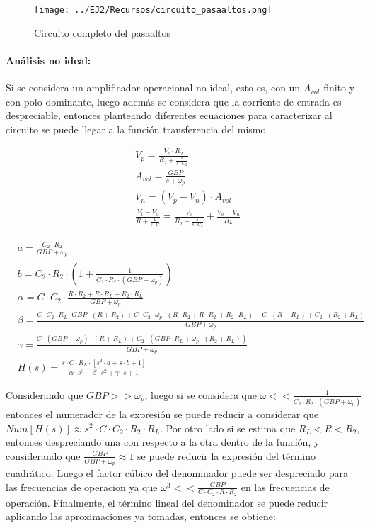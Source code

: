 \begin{figure}[H]
    \centering
    \texttt{[image: ../EJ2/Recursos/circuito\_pasaaltos.png]}
    \caption{Circuito completo del pasaaltos}
    \label{fig:circuito_pasaaltos}
\end{figure}

\paragraph*{An\'alisis no ideal:} Si se considera un amplificador operacional no ideal, esto es, con un $A_{vol}$ finito y con polo dominante, luego adem\'as
se considera que la corriente de entrada es despreciable, entonces planteando diferentes ecuaciones para caracterizar al circuito se puede llegar a la funci\'on transferencia
del mismo.

\begin{align}
    & V_p = \frac{V_o \cdot R_2}{R_2 + \frac{1}{s \cdot C_2}} \\
    & A_{vol} = \frac{GBP}{s + \omega_p} \\
    & V_n = (V_p - V_n) \cdot A_{vol} \\
    & \frac{V_i - V_o}{R + \frac{1}{s \cdot C}} = \frac{V_o}{R_2 + \frac{1}{s \cdot C_2}} + \frac{V_o - V_n}{R_L}
\end{align}

\begin{align*}
    & a = \frac{C_2 \cdot R_2}{GBP + \omega_p}\\
    & b = C_2 \cdot R_2 \cdot (1 + \frac{1}{C_2 \cdot R_2 \cdot(GBP + \omega_p)})\\
    & \alpha = C \cdot C_2 \cdot \frac{R \cdot R_2 + R \cdot R_L + R_2 \cdot R_L}{GBP + \omega_p}\\
    & \beta = \frac{ C \cdot C_2 \cdot R_L \cdot GBP \cdot (R + R_2) + C \cdot C_2 \cdot \omega_p \cdot (R \cdot R_2 + R \cdot R_L + R_2 \cdot R_L) + C \cdot (R + R_L) + C_2 \cdot (R_2 + R_L)}{GBP + \omega_p} \\
    & \gamma = \frac{C \cdot (GBP + \omega_p) \cdot (R + R_L) + C_2 \cdot (GBP \cdot R_L + \omega_p \cdot (R_2 + R_L)) }{GBP + \omega_p}\\
    & H(s) = \frac{s \cdot C \cdot R_L \cdot \left[s^{2} \cdot a + s \cdot b + 1 \right]}
    {\alpha \cdot s^{3} + \beta \cdot s^{2} + \gamma \cdot s + 1}
\end{align*}

Considerando que $GBP >> \omega_p$, luego si se considera que $\omega << \frac{1}{C_2 \cdot R_2 \cdot(GBP + \omega_p)}$ entonces el numerador de la expresi\'on se puede reducir
a considerar que $Num[H(s)] \approx s^{2} \cdot C \cdot C_2 \cdot R_2 \cdot R_L$. Por otro lado si se estima que $R_L < R < R_2$, entonces despreciando una con respecto a la otra dentro de la funci\'on,
y considerando que $\frac{GBP}{GBP + \omega_p} \approx 1$ se puede reducir la expresi\'on del t\'ermino cuadr\'atico. Luego el factor c\'ubico del denominador puede ser despreciado para las frecuencias de operacion
ya que $\omega^{3} << \frac{GBP}{C \cdot C_2 \cdot R \cdot R_2}$ en las frecuencias de operaci\'on. Finalmente, el t\'ermino lineal del denominador se puede reducir aplicando las aproximaciones ya tomadas, entonces se obtiene:

